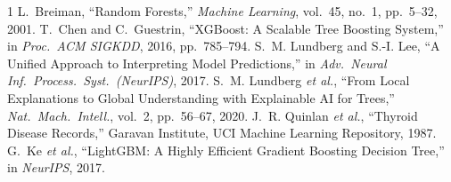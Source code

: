 \documentclass[conference]{IEEEtran}
\begin{document}
\begin{thebibliography}{1}
L.~Breiman, ``Random Forests,'' \emph{Machine Learning}, vol.~45, no.~1,
pp.~5--32, 2001.
T.~Chen and C.~Guestrin, ``XGBoost: A Scalable Tree Boosting System,'' in
\emph{Proc.\ ACM SIGKDD}, 2016, pp.~785--794.
S.~M. Lundberg and S.-I. Lee, ``A Unified Approach to Interpreting Model
Predictions,'' in \emph{Adv.\ Neural Inf.\ Process.\ Syst.\ (NeurIPS)}, 2017.
S.~M. Lundberg \emph{et al.}, ``From Local Explanations to Global Understanding
with Explainable AI for Trees,'' \emph{Nat.\ Mach.\ Intell.}, vol.~2, pp.~56--67,
2020.
J.~R. Quinlan \emph{et al.}, ``Thyroid Disease Records,'' Garavan Institute, UCI
Machine Learning Repository, 1987.
G.~Ke \emph{et al.}, ``LightGBM: A Highly Efficient Gradient Boosting Decision
Tree,'' in \emph{NeurIPS}, 2017.
\end{thebibliography}
\end{document}
